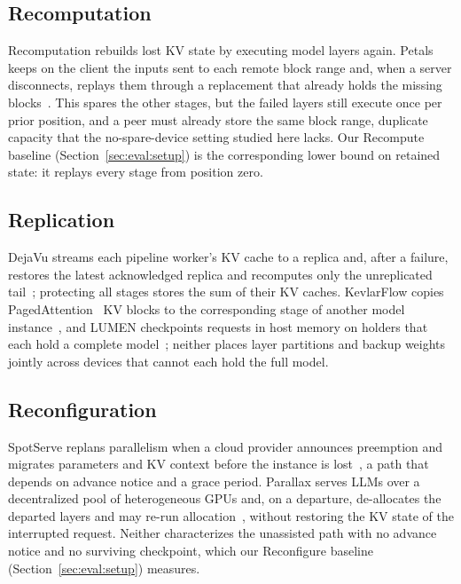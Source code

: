 \subsection{Recomputation}

Recomputation rebuilds lost KV state by executing model layers again.  Petals
keeps on the client the inputs sent to each remote block range and, when a
server disconnects, replays them through a replacement that already holds
the missing blocks~\cite{borzunov2023distributed}.  This spares the other
stages, but the failed layers still execute once per prior position, and a
peer must already store the same block range, duplicate capacity that the
no-spare-device setting studied here lacks.  Our Recompute baseline
(Section~\ref{sec:eval:setup}) is the corresponding lower bound on retained
state: it replays every stage from position zero.

\subsection{Replication}

DejaVu streams each pipeline worker's KV cache to a replica and, after a
failure, restores the latest acknowledged replica and recomputes only the
unreplicated tail~\cite{strati2024dejavu}; protecting all stages stores the
sum of their KV caches.  KevlarFlow copies PagedAttention~\cite{kwon2023efficient} KV blocks to the
corresponding stage of another model instance~\cite{qian2026kevlarflow}, and
LUMEN checkpoints requests in host memory on holders that each hold a
complete model~\cite{cao2026lumen}; neither places layer partitions and
backup weights jointly across devices that cannot each hold the full model.

\subsection{Reconfiguration}

SpotServe replans parallelism when a cloud provider announces preemption and
migrates parameters and KV context before the instance is
lost~\cite{miao2024spotserve}, a path that depends on advance notice and a
grace period.  Parallax serves LLMs over a decentralized pool of
heterogeneous GPUs and, on a departure, de-allocates the departed layers and
may re-run allocation~\cite{tong2025parallax}, without restoring the KV state
of the interrupted request.  Neither characterizes the unassisted path with
no advance notice and no surviving checkpoint, which our Reconfigure baseline
(Section~\ref{sec:eval:setup}) measures.

